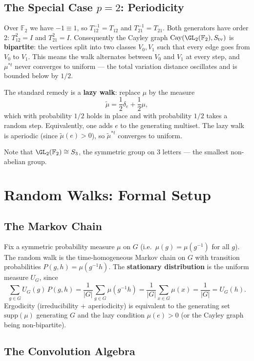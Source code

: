 \subsection{The Special Case $p = 2$: Periodicity}

Over $\mathbb{F}_2$ we have $-1 \equiv 1$, so $T_{12}^{-1} = T_{12}$ and
$T_{21}^{-1} = T_{21}$.
Both generators have order 2: $T_{12}^2 = I$ and $T_{21}^2 = I$.
Consequently the Cayley graph $\mathrm{Cay}(\GL_2(\mathbb{F}_2), S_{\mathrm{tv}})$
is \textbf{bipartite}: the vertices split into two classes $V_0, V_1$ such that
every edge goes from $V_0$ to $V_1$.
This means the walk alternates between $V_0$ and $V_1$ at every step,
and $\mu^{*t}$ never converges to uniform — the total variation distance
oscillates and is bounded below by $1/2$.

The standard remedy is a \textbf{lazy walk}: replace $\mu$ by the measure
\[
  \tilde\mu = \frac{1}{2}\delta_e + \frac{1}{2}\mu,
\]
which with probability $1/2$ holds in place and with probability $1/2$ takes a
random step.
Equivalently, one adds $e$ to the generating multiset.
The lazy walk is aperiodic (since $\tilde\mu(e) > 0$), so $\tilde\mu^{*t}$
converges to uniform.

Note that $\GL_2(\mathbb{F}_2) \cong S_3$, the symmetric group on 3 letters —
the smallest non-abelian group.

\section{Random Walks: Formal Setup}

\subsection{The Markov Chain}

Fix a symmetric probability measure $\mu$ on $G$ (i.e.\ $\mu(g) = \mu(g^{-1})$
for all $g$).
The random walk is the time-homogeneous Markov chain on $G$ with transition
probabilities $P(g, h) = \mu(g^{-1}h)$.
The \textbf{stationary distribution} is the uniform measure $U_G$, since
\[
  \sum_{g \in G} U_G(g)\,P(g, h)
  = \frac{1}{|G|}\sum_{g \in G}\mu(g^{-1}h)
  = \frac{1}{|G|}\sum_{x \in G}\mu(x)
  = \frac{1}{|G|}
  = U_G(h).
\]
Ergodicity (irreducibility + aperiodicity) is equivalent to the generating set
$\mathrm{supp}(\mu)$ generating $G$ and the lazy condition $\mu(e) > 0$
(or the Cayley graph being non-bipartite).

\subsection{The Convolution Algebra}

